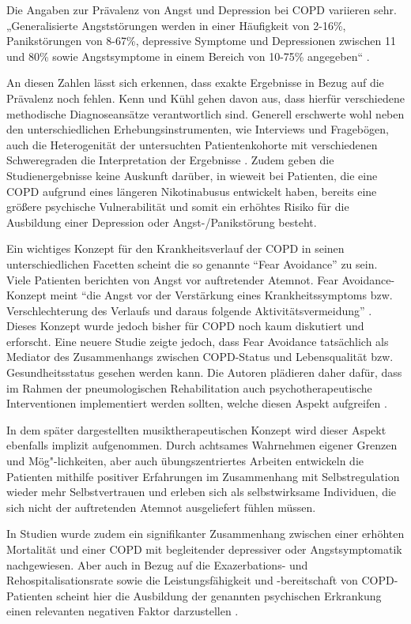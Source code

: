 Die Angaben zur Prävalenz von Angst und Depression bei COPD variieren sehr. „Generalisierte Angststörungen werden in einer Häufigkeit von 2-16\%, Panikstörungen von 8-67\%, depressive Symptome und Depressionen zwischen 11 und 80\% sowie Angstsymptome in einem Bereich von 10-75\% angegeben“  \autocite[34]{kenn2011}.

An diesen Zahlen lässt sich erkennen, dass exakte Ergebnisse in Bezug auf die Prävalenz noch fehlen. Kenn und Kühl gehen davon aus, dass hierfür verschiedene methodische Diagnoseansätze verantwortlich sind. Generell erschwerte wohl neben den unterschiedlichen Erhebungsinstrumenten, wie Interviews und Fragebögen, auch die Heterogenität der untersuchten Patientenkohorte mit verschiedenen Schweregraden die Interpretation der Ergebnisse \autocite[vgl.][35]{kenn2011}.
Zudem geben die Studienergebnisse keine Auskunft darüber, in wieweit bei Patienten, die eine COPD aufgrund eines längeren Nikotinabusus entwickelt haben, bereits eine größere psychische Vulnerabilität und somit ein erhöhtes Risiko für die Ausbildung einer Depression oder Angst-/Panikstörung besteht. 

Ein wichtiges Konzept für den Krankheitsverlauf der COPD in seinen unterschiedlichen Facetten scheint die so genannte "`Fear Avoidance"' zu sein. Viele Patienten berichten von Angst vor auftretender Atemnot. Fear Avoidance- Konzept meint "`die Angst vor der Verstärkung eines Krankheitssymptoms bzw. Verschlechterung des Verlaufs und daraus folgende Aktivitätsvermeidung"' \autocite[111]{stenzel2013}. Dieses Konzept wurde jedoch bisher für COPD noch kaum diskutiert und erforscht. Eine neuere Studie zeigte jedoch, dass Fear Avoidance tatsächlich als Mediator des Zusammenhangs zwischen COPD-Status und Lebensqualität bzw. Gesundheitsstatus gesehen werden kann. Die Autoren plädieren daher dafür, dass im Rahmen der pneumologischen Rehabilitation auch psychotherapeutische Interventionen implementiert werden sollten, welche diesen Aspekt aufgreifen \autocite[vgl.][112]{stenzel2013}. 

In dem später dargestellten musiktherapeutischen Konzept wird dieser Aspekt ebenfalls implizit aufgenommen. Durch achtsames Wahrnehmen eigener Grenzen und Mög"-lichkeiten, aber auch übungszentriertes Arbeiten entwickeln die Patienten mithilfe positiver Erfahrungen im Zusammenhang mit Selbstregulation wieder mehr Selbstvertrauen und erleben sich als selbstwirksame Individuen, die sich nicht der auftretenden Atemnot ausgeliefert fühlen müssen.

In Studien wurde zudem ein signifikanter Zusammenhang zwischen einer erhöhten Mortalität und einer COPD mit begleitender depressiver oder Angstsymptomatik nachgewiesen. Aber auch in Bezug auf die Exazerbations- und Rehospitalisationsrate sowie die Leistungsfähigkeit und -bereitschaft von COPD-Patienten scheint hier die Ausbildung der genannten psychischen Erkrankung einen relevanten negativen Faktor darzustellen \autocite[vgl.][]{kenn2011}.

